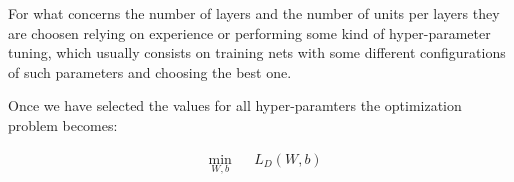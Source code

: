 For what concerns the number of layers and the number of units per layers they are choosen relying on experience or performing some kind of hyper-parameter tuning, which usually consists on training nets
with some different configurations of such parameters and choosing the best one.

Once we have selected the values for all hyper-paramters the optimization problem becomes:

\begin{align}
& \underset{W,b}{\text{min}}
& & L_D(W,b) \\
\end{align}




